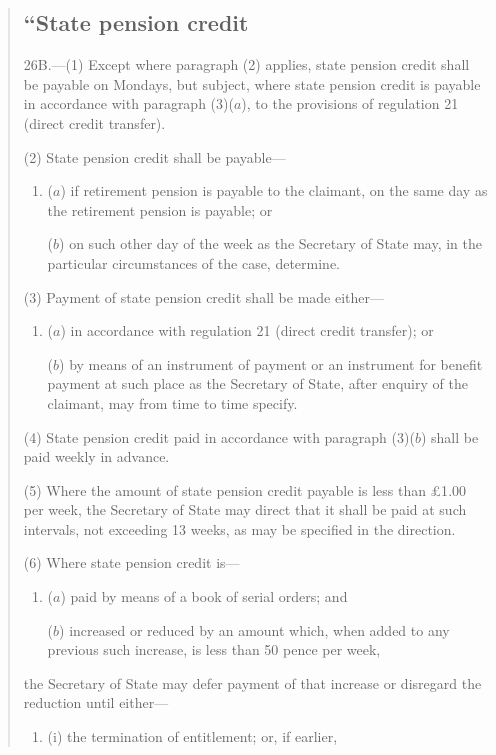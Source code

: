\documentclass[12pt,a4paper]{article}
\begin{document}
\begin{quotation}
\subsection*{“State pension credit}

26B.---(1)  Except where paragraph (2) applies, state pension credit shall be payable on Mondays, but subject, where state pension credit is payable in accordance with paragraph (3)($a$), to the provisions of regulation 21 (direct credit transfer).

(2) State pension credit shall be payable—
\begin{enumerate}\item[]
($a$) if retirement pension is payable to the claimant, on the same day as the retirement pension is payable; or

($b$) on such other day of the week as the Secretary of State may, in the particular circumstances of the case, determine.
\end{enumerate}

(3) Payment of state pension credit shall be made either—
\begin{enumerate}\item[]
($a$) in accordance with regulation 21 (direct credit transfer); or

($b$) by means of an instrument of payment or an instrument for benefit payment at such place as the Secretary of State, after enquiry of the claimant, may from time to time specify.
\end{enumerate}

(4) State pension credit paid in accordance with paragraph (3)($b$)  shall be paid weekly in advance.

(5) Where the amount of state pension credit payable is less than £1$.$00 per week, the Secretary of State may direct that it shall be paid at such intervals, not exceeding 13 weeks, as may be specified in the direction.

(6) Where state pension credit is—
\begin{enumerate}\item[]
($a$) paid by means of a book of serial orders; and

($b$) increased or reduced by an amount which, when added to any previous such increase, is less than 50 pence per week,
\end{enumerate}
the Secretary of State may defer payment of that increase or disregard the reduction until either—
\begin{enumerate}\item[]
(i) the termination of entitlement; or, if earlier,


\end{enumerate}
\end{quotation}
\end{document}
